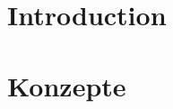\documentclass[12pt, a4paper]{report}
\begin{document}

\chapter{Introduction}


\chapter{Konzepte}

\printbibliography
\end{document}
